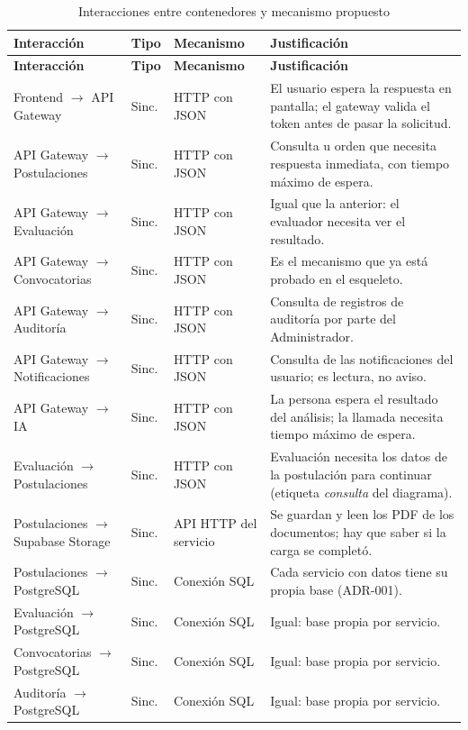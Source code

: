 {\small
\begin{longtable}{@{}p{3.7cm}p{1.3cm}p{2.9cm}p{5.6cm}@{}}
\caption{Interacciones entre contenedores y mecanismo propuesto}\\
\toprule
\textbf{Interacción} & \textbf{Tipo} & \textbf{Mecanismo} & \textbf{Justificación} \\
\midrule
\endfirsthead
\toprule
\textbf{Interacción} & \textbf{Tipo} & \textbf{Mecanismo} & \textbf{Justificación} \\
\midrule
\endhead
Frontend $\to$ API Gateway & Sinc. & HTTP con JSON & El usuario espera la respuesta en pantalla; el gateway valida el token antes de pasar la solicitud. \\
API Gateway $\to$ Postulaciones & Sinc. & HTTP con JSON & Consulta u orden que necesita respuesta inmediata, con tiempo máximo de espera. \\
API Gateway $\to$ Evaluación & Sinc. & HTTP con JSON & Igual que la anterior: el evaluador necesita ver el resultado. \\
API Gateway $\to$ Convocatorias & Sinc. & HTTP con JSON & Es el mecanismo que ya está probado en el esqueleto. \\
API Gateway $\to$ Auditoría & Sinc. & HTTP con JSON & Consulta de registros de auditoría por parte del Administrador. \\
API Gateway $\to$ Notificaciones & Sinc. & HTTP con JSON & Consulta de las notificaciones del usuario; es lectura, no aviso. \\
API Gateway $\to$ IA & Sinc. & HTTP con JSON & La persona espera el resultado del análisis; la llamada necesita tiempo máximo de espera. \\
Evaluación $\to$ Postulaciones & Sinc. & HTTP con JSON & Evaluación necesita los datos de la postulación para continuar (etiqueta \emph{consulta} del diagrama). \\
Postulaciones $\to$ Supabase Storage & Sinc. & API HTTP del servicio & Se guardan y leen los PDF de los documentos; hay que saber si la carga se completó. \\
Postulaciones $\to$ PostgreSQL & Sinc. & Conexión SQL & Cada servicio con datos tiene su propia base (ADR-001). \\
Evaluación $\to$ PostgreSQL & Sinc. & Conexión SQL & Igual: base propia por servicio. \\
Convocatorias $\to$ PostgreSQL & Sinc. & Conexión SQL & Igual: base propia por servicio. \\
Auditoría $\to$ PostgreSQL & Sinc. & Conexión SQL & Igual: base propia por servicio. \\

\end{longtable}}
